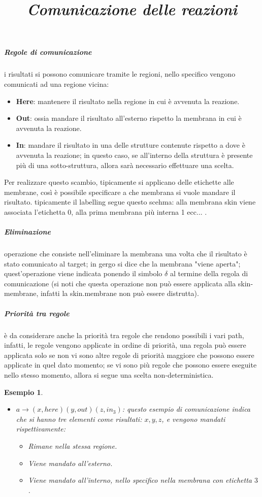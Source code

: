 \documentclass[12pt,a4paper]{report}
\newtheorem{esempio}{Esempio}[section]
\begin{document}
\subparagraph{Regole di comunicazione}
i risultati si possono comunicare tramite le regioni, nello specifico vengono comunicati ad una regione vicina:
\begin{itemize}
\item \textbf{Here}: mantenere il risultato nella regione in cui è avvenuta la reazione.
\item \textbf{Out}: ossia mandare il risultato all'esterno rispetto la membrana in cui è avvenuta la reazione.
\item \textbf{In}: mandare il risultato in una delle strutture contenute rispetto a dove è avvenuta la reazione; in questo caso, se all'interno della struttura è presente più di una sotto-struttura, allora sarà necessario effettuare una scelta.
\end{itemize}
Per realizzare questo scambio, tipicamente si applicano delle etichette alle membrane, così è possibile specificare a che membrana si vuole mandare il risultato. tipicamente il labelling segue questo scehma: alla membrana skin viene associata l'etichetta 0, alla prima membrana più interna 1 ecc... .

\subparagraph{Eliminazione}
operazione che consiste nell'eliminare la membrana  una volta che il risultato è stato comunicato al target; in gergo si dice che la membrana "viene aperta";
quest'operazione viene indicata ponendo il simbolo $\delta$ al termine della regola di comunicazione (si noti che questa operazione non può essere applicata alla skin-membrane, infatti la skin.membrane non può essere distrutta).

\subparagraph{Priorità tra regole}
è da considerare anche la priorità tra regole che rendono possibili i vari path, infatti, le regole vengono applicate in ordine di priorità, una regola può essere applicata solo se non vi sono altre regole di priorità maggiore che possono essere applicate in quel dato momento; se vi sono più regole che possono essere eseguite nello stesso momento, allora si segue una scelta non-deterministica.

\begin{esempio}
\title{\emph{Comunicazione delle reazioni}}
\begin{itemize}
\item $a \rightarrow (x, here) (y, out) (z, in_{3})$: questo esempio di comunicazione indica che si hanno tre elementi come risultati: $x, y, z$, e vengono mandati rispettivamente:
\begin{itemize}
\item Rimane nella stessa regione.
\item Viene mandato all'esterno.
\item Viene mandato all'interno, nello specifico nella membrana con etichetta $3$.
\end{itemize}
\end{itemize}
\end{esempio}
\end{document}
